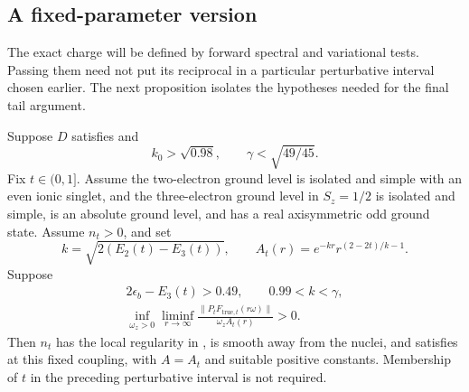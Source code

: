 \subsection{A fixed-parameter version}

The exact charge will be defined by forward spectral and variational
tests.  Passing them need not put its reciprocal in a particular
perturbative interval chosen earlier.  The next proposition isolates
the hypotheses needed for the final tail argument.

\begin{proposition}
\label{prop:fixed-parameter-channels}
Suppose \(D\) satisfies  and
\[
 k_0>\sqrt{0.98},\qquad \gamma<\sqrt{49/45}.
 \]
Fix \(t\in(0,1]\).  Assume the two-electron ground level is isolated
and simple with an even ionic singlet, and the three-electron
ground level in \(S_z=1/2\) is isolated and simple, is an absolute
ground level, and has a real axisymmetric odd ground state.
Assume \(n_t>0\), and set
\[
 k=\sqrt{2(E_2(t)-E_3(t))},\qquad
 A_t(r)=e^{-kr}r^{(2-2t)/k-1}.
 \]
Suppose
\begin{equation}
 \begin{gathered}
 2\epsilon_b-E_3(t)>0.49,\qquad 0.99<k<\gamma,\\
 \inf_{\omega_z>0}\liminf_{r\to\infty}
 \frac{\|P_tF_{\mathrm{true},t}(r\omega)\|}
      {\omega_z A_t(r)}>0.
 \end{gathered}
 \label{eq:fixed-channel-hypotheses}
\end{equation}
Then \(n_t\) has the local regularity in
, is smooth away from the nuclei,
and satisfies 
at this fixed coupling, with \(A=A_t\) and suitable positive constants.
Membership of \(t\) in the preceding perturbative interval is
not required.
\end{proposition}


